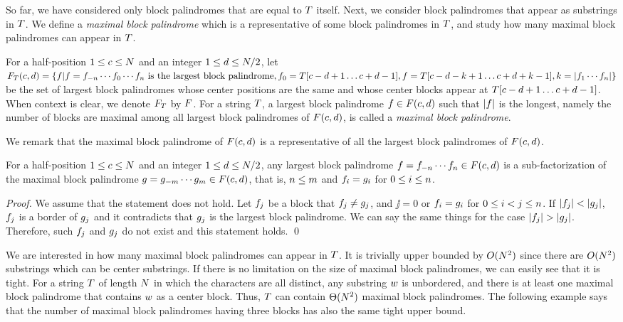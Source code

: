 So far, we have considered only block palindromes that are equal to $T$ itself.
Next, we consider block palindromes that appear as substrings in $T$.
We define a \emph{maximal block palindrome} which is a representative of some block palindromes in $T$, and study how many maximal block palindromes can appear in $T$.

For a half-position $1 \leq c \leq N$ and an integer $1 \leq d \leq N/2$, let $F_T(c, d)=\{f | f=f_{-n} \cdots f_0 \cdots f_{n} \mbox{ is the largest block palindrome}, f_0=T[c - d + 1 \ldots c + d-1], f=T[c - d - k+1 \ldots c + d + k-1], k = |f_1 \cdots f_n| \}$ be the set of largest block palindromes whose center positions are the same and whose center blocks appear at $T[c-d+1 \ldots c+d-1]$.
When context is clear, we denote $F_{T}$ by $F$.
For a string $T$, a largest block palindrome $f \in F(c, d)$ such that $|f|$ is the longest, namely the number of blocks are maximal among all largest block palindromes of $F(c, d)$, is called a \textit{maximal block palindrome}.


We remark that the maximal block palindrome of $F(c, d)$ is a representative of all the largest block palindromes of $F(c, d)$.

\begin{remarkx}
	\label{lem:maximal-palindrome-is-representative}
  For a half-position $1 \leq c \leq N$ and an integer $1 \leq d \leq N/2$, any largest block palindrome $f=f_{-n} \cdots f_{n} \in F(c, d)$ is a sub-factorization of the maximal block palindrome $g = g_{-m} \cdots g_{m} \in F(c, d)$, that is, $n \leq m$ and $f_{i}=g_{i}$ for $0 \leq i \leq n$.
\end{remarkx}
\begin{proof}
	We assume that the statement does not hold.
	Let $f_j$ be a block that $f_{j} \neq g_{j}$, and $\jj=0$ or $f_{i}=g_{i}$ for $0 \leq i < j \leq n$.
	If $|f_{j}| < |g_{j}|$, $f_{j}$ is a border of $g_{j}$ and it contradicts that $g_{j}$ is the largest block palindrome.
	We can say the same things for the case $|f_{j}| > |g_{j}|$.
	Therefore, such $f_j$ and $g_j$ do not exist and this statement holds.
	\qed
\end{proof}

We are interested in how many maximal block palindromes can appear in $T$.
It is trivially upper bounded by $O(N^2)$ since there are $O(N^2)$ substrings which can be center substrings.
If there is no limitation on the size of maximal block palindromes, we can easily see that it is tight.
For a string $T$ of length $N$ in which the characters are all distinct, any substring $w$ is unbordered, and there is at least one maximal block palindrome that contains $w$ as a center block.
Thus, $T$ can contain $\Theta(N^2)$ maximal block palindromes.
The following example says that the number of maximal block palindromes having three blocks has also the same tight upper bound.

